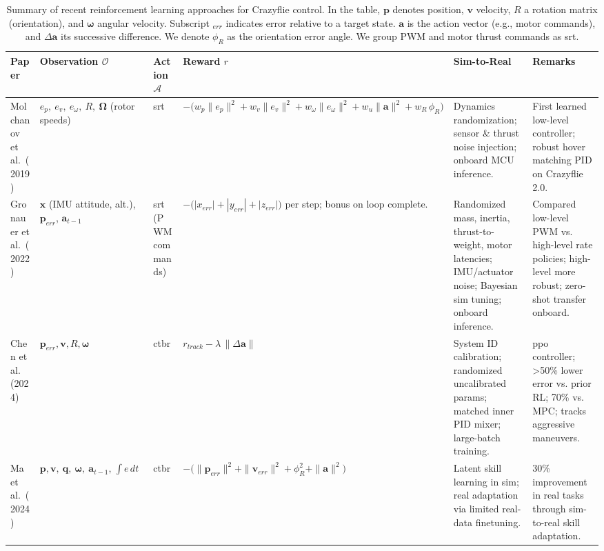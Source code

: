 \begin{table*}[!b]
\centering
\caption{Summary of recent reinforcement learning approaches for Crazyflie control. In the table, $\mathbf{p}$ denotes position, $\mathbf{v}$ velocity, $R$ a rotation matrix (orientation), and $\boldsymbol{\omega}$ angular velocity. Subscript $_{err}$ indicates error relative to a target state. $\mathbf{a}$ is the action vector (e.g., motor commands), and $\Delta \mathbf{a}$ its successive difference. We denote $\phi_R$ as the orientation error angle. We group PWM and motor thrust commands as \gls{srt}.}
\label{tab:rl_comparison}
\scriptsize
\begin{tabular}{p{2.0cm}<{\raggedright} p{2.5cm}<{\raggedright} p{2.0cm}<{\raggedright} p{3.0cm}<{\raggedright} p{2.8cm}<{\raggedright} p{2.7cm}<{\raggedright}}
\hline
\textbf{Paper} & \textbf{Observation $\mathcal{O}$} & \textbf{Action $\mathcal{A}$} & \textbf{Reward $r$} & \textbf{Sim-to-Real} & \textbf{Remarks} \\
\hline
Molchanov et al.\ (2019) \cite{molchanov_sim--multi-real_2019} & $e_p,\ e_v,\ e_\omega,\ R,\ \boldsymbol{\Omega}$ (rotor speeds) & \gls{srt} & { $-\bigl(w_p\|e_p\|^2 + w_v\|e_v\|^2 + w_\omega\|e_\omega\|^2 + w_u\|\mathbf{a}\|^2 + w_R\,\phi_R\bigr)$} & { Dynamics randomization; sensor \& thrust noise injection; onboard MCU inference.} & { First learned low-level controller; robust hover matching PID on Crazyflie 2.0.} \\[1ex]

Gronauer et al.\ (2022) \cite{gronauer_using_2022} & $\mathbf{x}$ (IMU attitude, alt.), $\mathbf{p}_{err}$, $\mathbf{a}_{t-1}$ & \gls{srt} (PWM commands) & { $-\bigl(|x_{err}|+|y_{err}|+|z_{err}|\bigr)$ per step; bonus on loop complete.} & { Randomized mass, inertia, thrust-to-weight, motor latencies; IMU/actuator noise; Bayesian sim tuning; onboard inference.} & { Compared low-level PWM vs. high-level rate policies; high-level more robust; zero-shot transfer onboard.} \\[1ex]

Chen et al. (2024) \cite{chen_what_2024} & $\mathbf{p}_{err}, \mathbf{v}, R, \boldsymbol{\omega}$ & \gls{ctbr} & { $r_{track} - \lambda\,\|\Delta\mathbf{a}\|$} & { System ID calibration; randomized uncalibrated params; matched inner PID mixer; large-batch training.} & { \gls{ppo} controller; >50\% lower error vs. prior RL; 70\% vs. MPC; tracks aggressive maneuvers.} \\[1ex]

Ma et al.\ (2024) \cite{ma2024skilltransfer} & $\mathbf{p},\mathbf{v},\ \mathbf{q},\ \boldsymbol{\omega},\ \mathbf{a}_{t-1},\,\int e\,dt$ & \gls{ctbr}& { $-\bigl(\|\mathbf{p}_{err}\|^2+\|\mathbf{v}_{err}\|^2+\phi_R^2+\|\mathbf{a}\|^2\bigr)$} & { Latent skill learning in sim; real adaptation via limited real-data finetuning.} & { 30\% improvement in real tasks through sim-to-real skill adaptation.} \\[1ex]


\end{tabular}
\end{table*}
